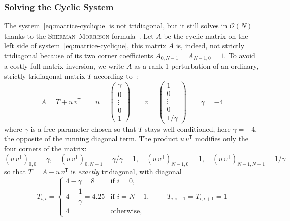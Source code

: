 \documentclass{tropLaClasse}
\begin{document}
\subsubsection{Solving the Cyclic System}


The system~\eqref{eq:matrice-cyclique} is not tridiagonal, but it still solves in $\mathcal{O}(N)$ thanks to the \textsc{Sherman--Morrison} formula~\cite{numerical_recipes}. Let $A$ be the cyclic matrix on the left side of system~\eqref{eq:matrice-cyclique}, this matrix $A$ is, indeed, not strictly tridiagonal because of its two corner coefficients $A_{0,N-1} = A_{N-1,0} = 1$. To avoid a costly full matrix inversion, we write $A$ as a rank-1 perturbation of an ordinary, strictly tridiagonal matrix $T$ according to~\cite{numerical_recipes}:
\begin{equation}
    A = T + u\,v^{\mathsf{T}} \qquad
    u = \begin{pmatrix} \gamma \\ 0 \\ \vdots \\ 0 \\ 1 \end{pmatrix} \qquad
    v = \begin{pmatrix} 1 \\ 0 \\ \vdots \\ 0 \\ 1/\gamma \end{pmatrix}
    \qquad \gamma = -4
    \label{eq:sherman-morrison-setup}
\end{equation}
where $\gamma$ is a free parameter chosen so that $T$ stays well conditioned, here $\gamma = -4$, the opposite of the running diagonal term. The product $u\,v^{\mathsf{T}}$ modifies only the four corners of the matrix:
\begin{equation}
    (u\,v^{\mathsf{T}})_{0,0} = \gamma, \quad
    (u\,v^{\mathsf{T}})_{0,N-1} = \gamma/\gamma = 1, \quad
    (u\,v^{\mathsf{T}})_{N-1,0} = 1, \quad
    (u\,v^{\mathsf{T}})_{N-1,N-1} = 1/\gamma
\end{equation}
so that $T = A - u\,v^{\mathsf{T}}$ is \emph{exactly} tridiagonal, with diagonal
\begin{equation}
    T_{i,i} =
    \begin{cases}
        4 - \gamma = 8 & \text{if } i = 0, \\[2pt]
        4 - \dfrac{1}{\gamma} = 4.25 & \text{if } i = N-1, \\[6pt]
        4 & \text{otherwise,}
    \end{cases}
    \qquad T_{i,i-1} = T_{i,i+1} = 1
    \label{eq:T-diag}
\end{equation}
\end{document}
